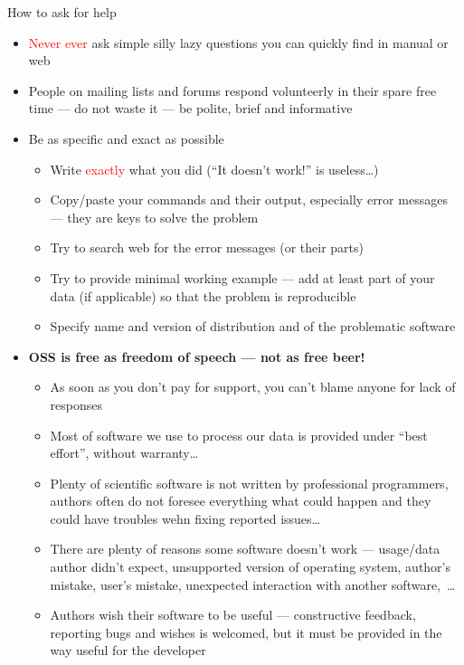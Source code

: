 \documentclass[compress, ucs, xelatex, 11pt, xcolor=svgnames, aspectratio=169,
	hyperref={
		bookmarks=true,
		unicode=true,
		colorlinks=true,
		pdftitle={Linux, command line and MetaCentrum},
		plainpages=false,
		pdfauthor={Vojtech Zeisek},
		pdfsubject={Course about use of Linux command line, writing shell scripts and using MetaCentrum of CESNET},
		pdfcreator={XeLaTeX},
		pdfkeywords={Linux, GNU, BASH, shell, command line, MetaCentrum},
		linkcolor=DarkRed, %
		anchorcolor=DarkBlue, %
		citecolor=Indigo, %
		filecolor=NavyBlue, %
		menucolor=DarkMagenta, %
		urlcolor=DarkBlue, %
		pdftex},
	url={hyphens, lowtilde} %
	]{beamer}
\renewcommand{\alert}[1]{\textcolor{red}{#1}}
\begin{document}
\begin{frame}[allowframebreaks]{How to ask for help}
	\label{howtoask}
	\begin{itemize}
		\item \alert{Never ever} ask simple silly lazy questions you can quickly find in manual or web
		\item People on mailing lists and forums respond volunteerly in their spare free time --- do not waste it --- be polite, brief and informative
		\item Be as specific and exact as possible
		\begin{itemize}
			\item Write \alert{exactly} what you did (\enquote{It doesn't work!} is useless\ldots)
			\item Copy/paste your commands and their output, especially error messages --- they are keys to solve the problem
			\item Try to search web for the error messages (or their parts)
			\item Try to provide minimal working example --- add at least part of your data (if applicable) so that the problem is reproducible
			\item Specify name and version of distribution and of the problematic software
		\end{itemize}
		\item \textbf{OSS is free as freedom of speech --- not as free beer!}
		\begin{itemize}
			\item As soon as you don't pay for support, you can't blame anyone for lack of responses
			\item Most of software we use to process our data is provided under \enquote{best effort}, without warranty\ldots
			\item Plenty of scientific software is not written by professional programmers, authors often do not foresee everything what could happen and they could have troubles wehn fixing reported issues\ldots
			\item There are plenty of reasons some software doesn't work --- usage/data author didn't expect, unsupported version of operating system, author's mistake, user's mistake, unexpected interaction with another software,~\ldots
			\item Authors wish their software to be useful --- constructive feedback, reporting bugs and wishes is welcomed, but it must be provided in the way useful for the developer
		\end{itemize}

\end{itemize}
\end{frame}
\end{document}
